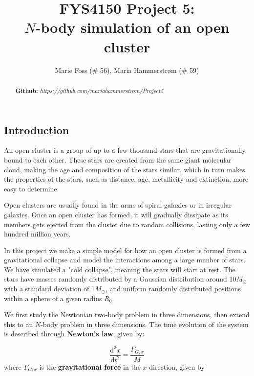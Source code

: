 \documentclass{article}
\title{\textbf{FYS4150 Project 5: \\$N$-body simulation of an open cluster}}
\author{Marie Foss (\# 56), Maria Hammerstr{{\o}}m (\# 59)}
\date{}
\begin{document}
\maketitle

\begin{abstract}
	\noindent \lipsum[1]
	\vspace*{2ex}
	
	\noindent \textbf{Github:} \textit{https://github.com/mariahammerstrom/Project5}
	\vspace*{2ex}
\end{abstract}



\begin{multicols}{2}

\section{Introduction}

An open cluster is a group of up to a few thousand stars that are gravitationally bound to each other. These stars are created from the same giant molecular cloud, making the age and composition of the stars similar, which in turn makes the properties of the stars, such as distance, age, metallicity and extinction, more easy to determine. 

Open clusters are usually found in the arms of spiral galaxies or in irregular galaxies. Once an open cluster has formed, it will gradually dissipate as its members gets ejected from the cluster due to random collisions, lasting only a few hundred million years. 


In this project we make a simple model for how an open cluster is formed from a gravitational collapse and model the interactions among a large number of stars. We have simulated a "cold collapse", meaning the stars will start at rest. The stars have masses randomly distributed by a Gaussian distribution around 10$M_{\odot}$ with a standard deviation of 1$M_{\odot}$, and uniform randomly distributed positions within a sphere of a given radius $R_0$. 

We first study the Newtonian two-body problem in three dimensions, then extend this to an $N$-body problem in three dimensions. The time evolution of the system is described through \textbf{Newton's law}, given by:

\begin{equation}\label{eq:ODE}
	\frac{\mathrm{d}^2 x}{\mathrm{d}t^2} = \frac{F_{G,x}}{M}
\end{equation}
where $F_{G,x}$ is the \textbf{gravitational force} in the $x$ direction, given by 


\end{multicols}
\end{document}
